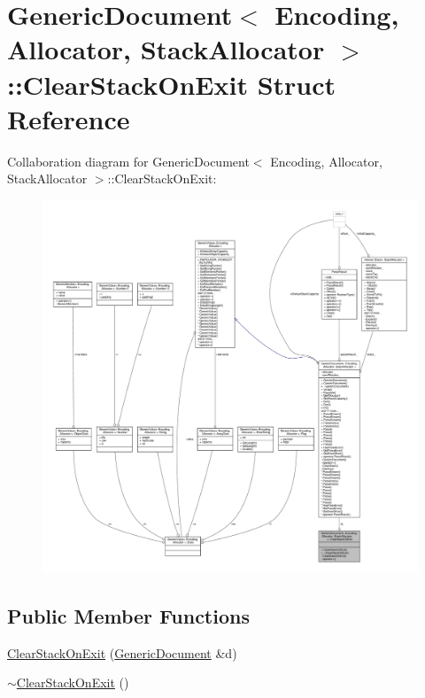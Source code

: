 \hypertarget{structGenericDocument_1_1ClearStackOnExit}{}\section{Generic\+Document$<$ Encoding, Allocator, Stack\+Allocator $>$\+:\+:Clear\+Stack\+On\+Exit Struct Reference}
\label{structGenericDocument_1_1ClearStackOnExit}


Collaboration diagram for Generic\+Document$<$ Encoding, Allocator, Stack\+Allocator $>$\+:\+:Clear\+Stack\+On\+Exit\+:
\nopagebreak
\begin{figure}[H]
\begin{center}
\leavevmode
\includegraphics[width=350pt]{structGenericDocument_1_1ClearStackOnExit__coll__graph}
\end{center}
\end{figure}
\subsection*{Public Member Functions}
\begin{DoxyCompactItemize}
\item 
\hyperlink{structGenericDocument_1_1ClearStackOnExit_a99ba88d8b8ae15ccf5c979fff80c713a}{Clear\+Stack\+On\+Exit} (\hyperlink{classGenericDocument}{Generic\+Document} \&d)
\item 
\hyperlink{structGenericDocument_1_1ClearStackOnExit_aa51248f341ec130a29e4f8c3705c9312}{$\sim$\+Clear\+Stack\+On\+Exit} ()
\end{DoxyCompactItemize}
